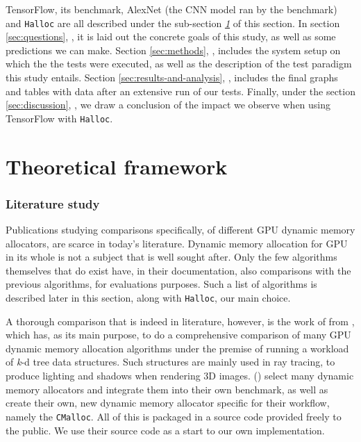 \documentclass[12pt,twoside]{article}
\begin{document}
TensorFlow, its benchmark, AlexNet (the CNN model ran by the benchmark) and \texttt{Halloc} are all described under the sub-section \textit{\ref{sec:theoretical-framework} } of this \textit{} section. In section \ref{sec:questions}, \textit{}, it is laid out the concrete goals of this study, as well as some predictions we can make. Section \ref{sec:methods}, \textit{}, includes the system setup on which the the tests were executed, as well as the description of the test paradigm this study entails. Section \ref{sec:results-and-analysis}, \textit{}, includes the final graphs and tables with data after an extensive run of our tests. Finally, under the section \ref{sec:discussion}, \textit{}, we draw a conclusion of the impact we observe when using TensorFlow with \texttt{Halloc}. 

\section{Theoretical framework}
\label{sec:theoretical-framework}

\subsubsection*{Literature study}

Publications studying comparisons specifically, of different GPU dynamic memory allocators, are scarce in today's literature. Dynamic memory allocation for GPU in its whole is not a subject that is well sought after. Only the few algorithms themselves that do exist have, in their documentation, also comparisons with the previous algorithms, for evaluations purposes. Such a list of algorithms is described later in this section, along with \texttt{Halloc}, our main choice.

A thorough comparison that is indeed in literature, however, is the work of \citeauthor{Vinkler2015} from \citeyear{Vinkler2015}, which has, as its main purpose, to do a comprehensive comparison of many GPU dynamic memory allocation algorithms under the premise of running a workload of \textit{k}-d tree data structures. Such structures are mainly used in ray tracing, to produce lighting and shadows when rendering 3D images. \citeauthor{Vinkler2015} (\citeyear{Vinkler2015}) select many dynamic memory allocators and integrate them into their own benchmark, as well as create their own, new dynamic memory allocator specific for their workflow, namely the \texttt{CMalloc}. All of this is packaged in a source code provided freely to the public. We use their source code as a start to our own implementation.
\end{document}
